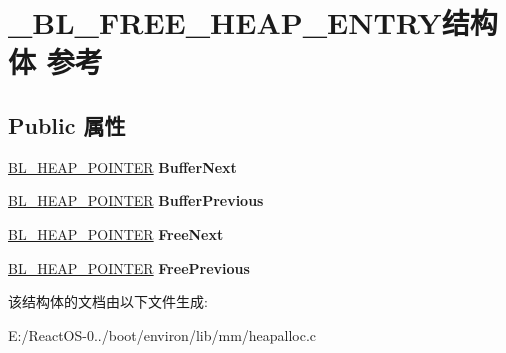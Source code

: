 \hypertarget{struct___b_l___f_r_e_e___h_e_a_p___e_n_t_r_y}{}\section{\+\_\+\+B\+L\+\_\+\+F\+R\+E\+E\+\_\+\+H\+E\+A\+P\+\_\+\+E\+N\+T\+R\+Y结构体 参考}
\label{struct___b_l___f_r_e_e___h_e_a_p___e_n_t_r_y}
\subsection*{Public 属性}
\begin{DoxyCompactItemize}
\item 
\mbox{\label{struct___b_l___f_r_e_e___h_e_a_p___e_n_t_r_y_aa934425c591fb86787d5a59284c38f57}} 
\hyperlink{struct___b_l___h_e_a_p___p_o_i_n_t_e_r}{B\+L\+\_\+\+H\+E\+A\+P\+\_\+\+P\+O\+I\+N\+T\+ER} {\bfseries Buffer\+Next}
\item 
\mbox{\label{struct___b_l___f_r_e_e___h_e_a_p___e_n_t_r_y_a0e3d92f54d2f5c841728a1736e230768}} 
\hyperlink{struct___b_l___h_e_a_p___p_o_i_n_t_e_r}{B\+L\+\_\+\+H\+E\+A\+P\+\_\+\+P\+O\+I\+N\+T\+ER} {\bfseries Buffer\+Previous}
\item 
\mbox{\label{struct___b_l___f_r_e_e___h_e_a_p___e_n_t_r_y_a2140f4d8ccedb0653a7a6ae0df6fe610}} 
\hyperlink{struct___b_l___h_e_a_p___p_o_i_n_t_e_r}{B\+L\+\_\+\+H\+E\+A\+P\+\_\+\+P\+O\+I\+N\+T\+ER} {\bfseries Free\+Next}
\item 
\mbox{\label{struct___b_l___f_r_e_e___h_e_a_p___e_n_t_r_y_add7a2558b4e35f002f5a6a2dbffd0248}} 
\hyperlink{struct___b_l___h_e_a_p___p_o_i_n_t_e_r}{B\+L\+\_\+\+H\+E\+A\+P\+\_\+\+P\+O\+I\+N\+T\+ER} {\bfseries Free\+Previous}
\end{DoxyCompactItemize}


该结构体的文档由以下文件生成\+:\begin{DoxyCompactItemize}
\item 
E\+:/\+React\+O\+S-\/0../boot/environ/lib/mm/heapalloc.\+c\end{DoxyCompactItemize}
